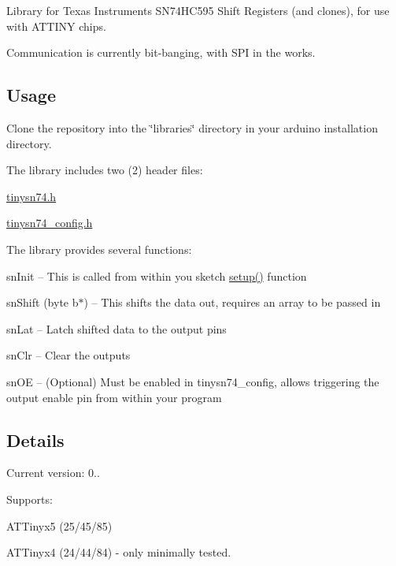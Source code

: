 Library for Texas Instruments S\+N74\+H\+C595 Shift Registers (and clones), for use with A\+T\+T\+I\+NY chips.

Communication is currently bit-\/banging, with S\+PI in the works.

\subsection*{Usage}

Clone the repository into the \char`\"{}libraries\char`\"{} directory in your arduino installation directory.

The library includes two (2) header files\+:
\begin{DoxyItemize}
\item \hyperlink{tinysn74_8h_source}{tinysn74.\+h}
\item \hyperlink{tinysn74__config_8h_source}{tinysn74\+\_\+config.\+h}
\end{DoxyItemize}

The library provides several functions\+:
\begin{DoxyItemize}
\item sn\+Init -- This is called from within you sketch \hyperlink{SN74__Count_8ino_a4fc01d736fe50cf5b977f755b675f11d}{setup()} function
\item sn\+Shift (byte b$\ast$) -- This shifts the data out, requires an array to be passed in
\item sn\+Lat -- Latch shifted data to the output pins
\item sn\+Clr -- Clear the outputs
\item sn\+OE -- (Optional) Must be enabled in tinysn74\+\_\+config, allows triggering the output enable pin from within your program
\end{DoxyItemize}

\subsection*{Details}


\begin{DoxyItemize}
\item Current version\+: 0..
\item Supports\+:
\begin{DoxyItemize}
\item A\+T\+Tinyx5 (25/45/85)
\item A\+T\+Tinyx4 (24/44/84) -\/ only minimally tested.
\end{DoxyItemize}
\end{DoxyItemize}

